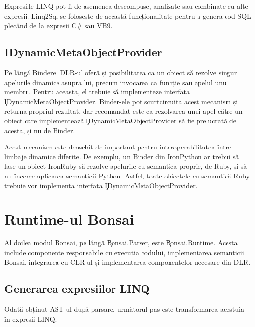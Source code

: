 \documentclass[12pt,a4paper]{memoir}
\begin{document}
Expresiile LINQ pot fi de asemenea descompuse, analizate sau combinate cu alte expresii. Linq2Sql se folosește de această funcționalitate pentru a genera cod SQL plecând de la expresii C\# sau VB9.

\section{IDynamicMetaObjectProvider}\label{sec:IDynamicMetaObjectProvider}

Pe lângă Bindere, DLR-ul oferă și posibilitatea ca un obiect să rezolve singur apelurile dinamice asupra lui, precum invocarea ca funcție sau apelul unui membru. Pentru aceasta, el trebuie să implementeze interfața \\ \c{IDynamicMetaObjectProvider}\cite{i_dynamic_meta_object_provider}. Binder-ele pot scurtcircuita acest mecanism și returna propriul rezultat, dar recomandat este ca rezolvarea unui apel către un obiect care implementează \c{IDynamicMetaObjectProvider} să fie prelucrată de acesta, și nu de Binder.

Acest mecanism este deosebit de important pentru interoperabilitatea între limbaje dinamice diferite. De exemplu, un Binder din IronPython ar trebui să lase un obiect IronRuby să rezolve apelurile cu semantica proprie, de Ruby, și să nu încerce aplicarea semanticii Python. Astfel, toate obiectele cu semantică Ruby trebuie vor implementa interfața \c{IDynamicMetaObjectProvider}.

\chapter{Runtime-ul Bonsai}

Al doilea modul Bonsai, pe lângă \c{Bonsai.Parser}, este \c{Bonsai.Runtime}. Acesta include componente responsabile cu executia codului, implementarea semanticii Bonsai, integrarea cu CLR-ul și implementarea componentelor necesare din DLR.

\section{Generarea expresiilor LINQ}

Odată obținut AST-ul după parsare, următorul pas este transformarea acestuia în expresii LINQ\cite{linq_expressions}. 
\end{document}
